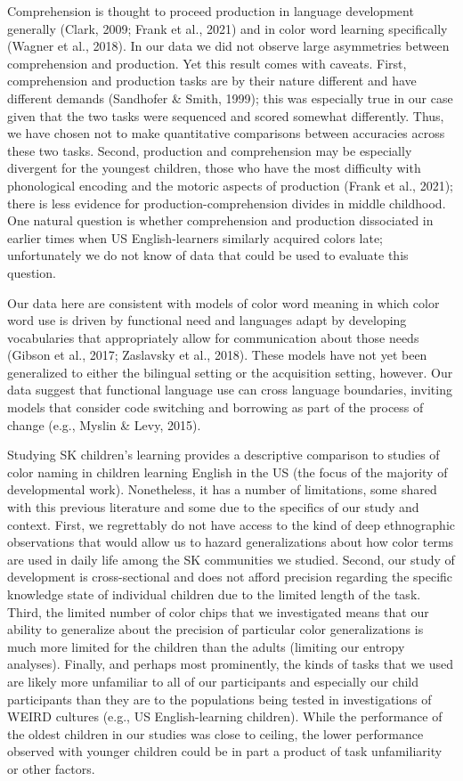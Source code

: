 \documentclass[
  english,
  ,apa7,floatsintext]{apa6}
\begin{document}
Comprehension is thought to proceed production in language development generally (Clark, 2009; Frank et al., 2021) and in color word learning specifically (Wagner et al., 2018). In our data we did not observe large asymmetries between comprehension and production. Yet this result comes with caveats. First, comprehension and production tasks are by their nature different and have different demands (Sandhofer \& Smith, 1999); this was especially true in our case given that the two tasks were sequenced and scored somewhat differently. Thus, we have chosen not to make quantitative comparisons between accuracies across these two tasks. Second, production and comprehension may be especially divergent for the youngest children, those who have the most difficulty with phonological encoding and the motoric aspects of production (Frank et al., 2021); there is less evidence for production-comprehension divides in middle childhood. One natural question is whether comprehension and production dissociated in earlier times when US English-learners similarly acquired colors late; unfortunately we do not know of data that could be used to evaluate this question.

Our data here are consistent with models of color word meaning in which color word use is driven by functional need and languages adapt by developing vocabularies that appropriately allow for communication about those needs (Gibson et al., 2017; Zaslavsky et al., 2018). These models have not yet been generalized to either the bilingual setting or the acquisition setting, however. Our data suggest that functional language use can cross language boundaries, inviting models that consider code switching and borrowing as part of the process of change (e.g., Myslin \& Levy, 2015).

Studying SK children's learning provides a descriptive comparison to studies of color naming in children learning English in the US (the focus of the majority of developmental work). Nonetheless, it has a number of limitations, some shared with this previous literature and some due to the specifics of our study and context. First, we regrettably do not have access to the kind of deep ethnographic observations that would allow us to hazard generalizations about how color terms are used in daily life among the SK communities we studied. Second, our study of development is cross-sectional and does not afford precision regarding the specific knowledge state of individual children due to the limited length of the task. Third, the limited number of color chips that we investigated means that our ability to generalize about the precision of particular color generalizations is much more limited for the children than the adults (limiting our entropy analyses). Finally, and perhaps most prominently, the kinds of tasks that we used are likely more unfamiliar to all of our participants and especially our child participants than they are to the populations being tested in investigations of WEIRD cultures (e.g., US English-learning children). While the performance of the oldest children in our studies was close to ceiling, the lower performance observed with younger children could be in part a product of task unfamiliarity or other factors.
\end{document}
